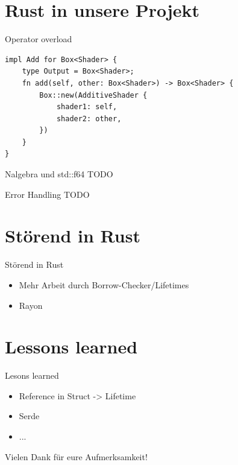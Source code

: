 \documentclass[aspectratio=169]{beamer}
\begin{document}
\section{Rust in unsere Projekt}
\begin{frame}[fragile]{Operator overload}
    \begin{lstlisting}
impl Add for Box<Shader> {
    type Output = Box<Shader>;
    fn add(self, other: Box<Shader>) -> Box<Shader> {
        Box::new(AdditiveShader {
            shader1: self,
            shader2: other,
        })
    }
}
    \end{lstlisting}
\end{frame}
\begin{frame}{Nalgebra und std::f64}
    TODO
\end{frame}
\begin{frame}{Error Handling}
    TODO
\end{frame}
\section{Störend in Rust}
\begin{frame}{Störend in Rust}
    \begin{itemize}[<+->]
        \item Mehr Arbeit durch Borrow-Checker/Lifetimes
        \item Rayon
    \end{itemize}
\end{frame}
\section{Lessons learned}
\begin{frame}{Lesons learned}
    \begin{itemize}[<+->]
        \item Reference in Struct -> Lifetime
        \item Serde
        \item ...
    \end{itemize}
\end{frame}

\begin{frame}[standout]
\centering
\Huge Vielen Dank für eure Aufmerksamkeit!

\end{frame}
\end{document}
